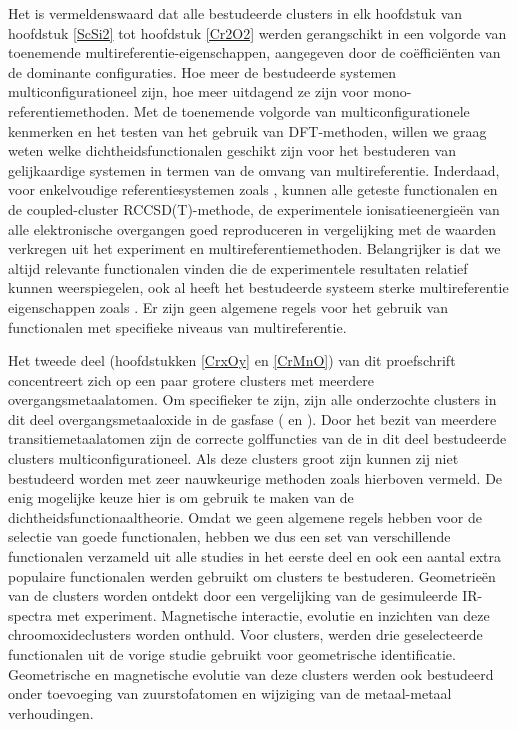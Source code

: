 Het is vermeldenswaard dat alle bestudeerde clusters in elk hoofdstuk van hoofdstuk \ref{ScSi2} tot hoofdstuk \ref{Cr2O2} werden gerangschikt in een volgorde van toenemende multireferentie-eigenschappen, aangegeven door de coëfficiënten van de dominante configuraties. Hoe meer de bestudeerde systemen multiconfigurationeel zijn, hoe meer uitdagend ze zijn voor mono-referentiemethoden. Met de toenemende volgorde van multiconfigurationele kenmerken en het testen van het gebruik van DFT-methoden, willen we graag weten welke dichtheidsfunctionalen geschikt zijn voor het bestuderen van gelijkaardige systemen in termen van de omvang van multireferentie. Inderdaad, voor enkelvoudige referentiesystemen zoals , kunnen alle geteste functionalen en de coupled-cluster RCCSD(T)-methode, de experimentele ionisatieenergieën van alle elektronische overgangen goed reproduceren in vergelijking met de waarden verkregen uit het experiment en multireferentiemethoden. Belangrijker is dat we altijd relevante functionalen vinden die de experimentele resultaten relatief kunnen weerspiegelen, ook al heeft het bestudeerde systeem sterke multireferentie eigenschappen zoals . Er zijn geen algemene regels voor het gebruik van functionalen met specifieke niveaus van multireferentie.




Het tweede deel (hoofdstukken \ref{CrxOy} en \ref{CrMnO}) van dit proefschrift concentreert zich op een paar grotere clusters met meerdere overgangsmetaalatomen. Om specifieker te zijn, zijn alle onderzochte clusters in dit deel overgangsmetaaloxide in de gasfase ( en ). Door het bezit van meerdere transitiemetaalatomen zijn de correcte golffuncties van de in dit deel bestudeerde clusters multiconfigurationeel. Als deze clusters groot zijn kunnen zij niet bestudeerd worden met zeer nauwkeurige methoden zoals hierboven vermeld. De enig mogelijke keuze hier is om gebruik te maken van de dichtheidsfunctionaaltheorie. Omdat we geen algemene regels hebben voor de selectie van goede functionalen, hebben we dus een set van verschillende functionalen verzameld uit alle studies in het eerste deel en ook een aantal extra populaire functionalen werden gebruikt om  clusters te bestuderen. Geometrieën van de clusters worden ontdekt door een vergelijking van de gesimuleerde IR-spectra met experiment. Magnetische interactie, evolutie en inzichten van deze chroomoxideclusters worden onthuld. Voor  clusters, werden drie geselecteerde functionalen uit de vorige studie gebruikt voor geometrische identificatie. Geometrische en magnetische evolutie van deze clusters werden ook bestudeerd onder toevoeging van zuurstofatomen en wijziging van de metaal-metaal verhoudingen. 










\cleardoublepage

